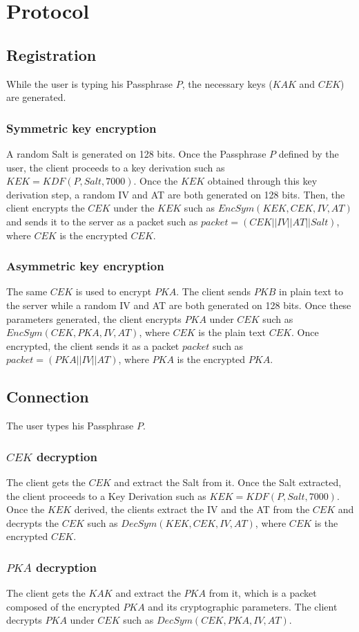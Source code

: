 \documentclass[a4paper,10pt]{article}
\begin{document}
\section{Protocol}
\subsection{Registration}
While the user is typing his Passphrase $P$, the necessary keys ($KAK$ and $CEK$) are generated.
\subsubsection{Symmetric key encryption}
A random Salt is generated on 128 bits. Once the Passphrase $P$ defined by the user, the client proceeds to a key derivation such as $KEK=KDF(P,Salt, 7000)$. Once the $KEK$ obtained through this key derivation step, a random IV and AT are both generated on 128 bits. Then, the client encrypts the $CEK$ under the $KEK$ such as $EncSym(KEK, CEK,IV,AT)$ and sends it to the server as a packet such as $packet=(CEK||IV||AT||Salt)$, where $CEK$ is the encrypted $CEK$.
\subsubsection{Asymmetric key encryption}
The same $CEK$ is used to encrypt $PKA$. The client sends $PKB$ in plain text to the server while a random IV and AT are both generated on 128 bits. Once these parameters generated, the client encrypts $PKA$ under $CEK$ such as $EncSym(CEK, PKA, IV, AT)$, where $CEK$ is the plain text $CEK$. Once encrypted, the client sends it as a packet $packet$ such as $packet=(PKA||IV||AT)$, where $PKA$ is the encrypted $PKA$.

\subsection{Connection}
The user types his Passphrase $P$.

\subsubsection{$CEK$ decryption}
The client gets the $CEK$ and extract the Salt from it. Once the Salt extracted, the client proceeds to a Key Derivation such as $KEK=KDF(P,Salt,7000)$. Once the $KEK$ derived, the clients extract the IV and the AT from the $CEK$ and decrypts the $CEK$ such as $DecSym(KEK,CEK,IV,AT)$, where $CEK$ is the encrypted $CEK$.
\subsubsection{$PKA$ decryption}
The client gets the $KAK$ and extract the $PKA$ from it, which is a packet composed of the encrypted $PKA$ and its cryptographic parameters. The client decrypts $PKA$ under $CEK$ such as $DecSym(CEK, PKA, IV,AT)$.
\end{document}
